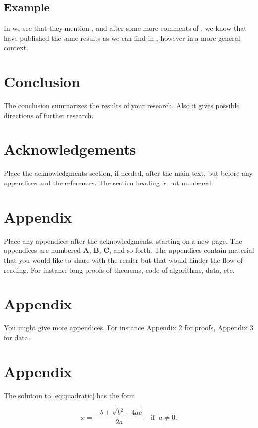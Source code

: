 \documentclass[a4paper,11pt]{article}
\theoremstyle{plain}
\theoremstyle{definition}
\begin{document}
\subsection{Example}
In \citet{asmus07} we see that they mention \citep{blitzstein10},
and after some more comments of \citet{asrub1}, we know that
\citet{evkekro07} have published the same results
as we can find in \citep{alon,garvels00,ross06},
however in a more general context.

\section{Conclusion}\label{s:con}
The conclusion summarizes the results of your research.
Also it gives possible directions of further research.

\section*{Acknowledgements}
Place the acknowledgments section, if needed, after the main text, 
but before any appendices and the references. The section heading is not numbered.

\newpage
\appendix


\section{Appendix}\label{s:app1}
Place any appendices after the acknowledgments, starting on a new page.
The appendices are numbered
\textbf{A}, \textbf{B}, \textbf{C}, and so forth.
The appendices contain material that you would like to share with the
reader but that would hinder the flow of reading. For instance long
proofs of theorems, code of algorithms, data, etc.

\section{Appendix}\label{s:app2}
You might give more appendices. For instance Appendix \ref{s:app1} for
proofs, Appendix \ref{s:app2} for data.

\section{Appendix}\label{app:quadratic}
The solution to \eqref{eq:quadratic} has the form

\begin{equation} \label{eq:quadraticsol}
x = \frac{-b \pm \sqrt{b^2-4ac}}{2a} \quad\text{if}\;\; a \ne 0.
\end{equation}



\end{document}
